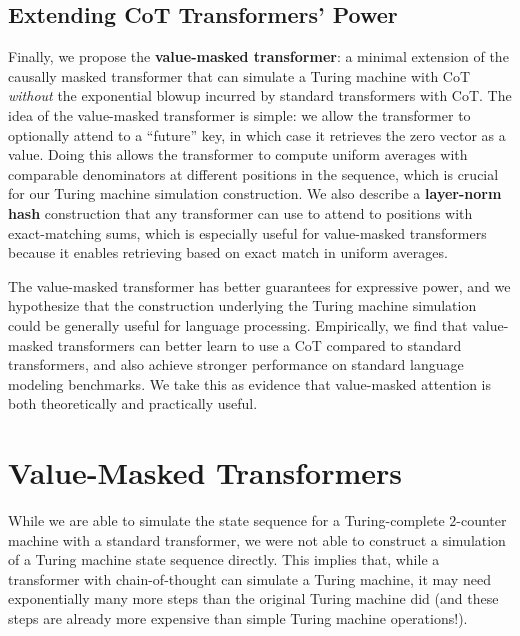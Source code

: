 \subsection{Extending CoT Transformers' Power}

Finally, we propose the \textbf{value-masked transformer}: a minimal extension of the causally masked transformer that can simulate a Turing machine with CoT \emph{without} the exponential blowup incurred by standard transformers with CoT. The idea of the value-masked transformer is simple: we allow the transformer to optionally attend to a ``future'' key, in which case it retrieves the zero vector as a value. Doing this allows the transformer to compute uniform averages with comparable denominators at different positions in the sequence, which is crucial for our Turing machine simulation construction. We also describe a \textbf{layer-norm hash} construction that any transformer can use to attend to positions with exact-matching sums, which is especially useful for value-masked transformers because it enables retrieving based on exact match in uniform averages.

The value-masked transformer has better guarantees for expressive power, and we hypothesize that the construction underlying the Turing machine simulation could be generally useful for language processing. Empirically, we find that value-masked transformers can better learn to use a CoT compared to standard transformers, and also achieve stronger performance on standard language modeling benchmarks. We take this as evidence that value-masked attention is both theoretically and practically useful. 

\section{Value-Masked Transformers}


While we are able to simulate the state sequence for a Turing-complete $2$-counter machine with a standard transformer, we were not able to construct a simulation of a Turing machine state sequence directly. This implies that, while a transformer with chain-of-thought can simulate a Turing machine, it may need exponentially many more steps than the original Turing machine did (and these steps are already more expensive than simple Turing machine operations!).

